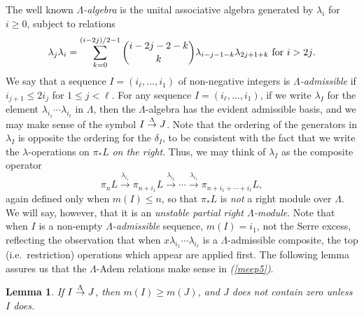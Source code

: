 \documentclass[11pt]{amsart} \renewcommand{\baselinestretch}{1.2}
\theoremstyle{plain}
\newtheorem{lem}[thm]{Lemma}
\numberwithin{equation}{section} %
\theoremstyle{plain}
\newtheorem{lem}[thm]{Lemma}
\numberwithin{equation}{chapter} %
\renewcommand{\to}{\longrightarrow}
\newcommand{\minDimDelta}{m}
\newcommand{\produces}[3]{#3:#1\sim #2}
\renewcommand{\produces}[3]{#1\rightarrow_{#3} #2}%
\renewcommand{\produces}[3]{#1\overset{\smash{#3}}{\rightarrow} #2}%
\begin{document}
\begin{Constructing homotopy operations}
The well known \emph{$\Lambda$-algebra} is the unital associative algebra generated by $\lambda_i$ for $i\geq0$, subject to relations \[\lambda_j\lambda_i=\sum_{k=0}^{(i-2j)/2-1}\binom{i-2j-2-k}{ k}\lambda_{i-j-1-k}\lambda_{2j+1+k}\textup{\ for $i>2j$.}\]
We say that a sequence $I=(i_\ell,\ldots,i_1)$ of non-negative integers is \emph{$\Lambda$-admissible} if $i_{j+1}\leq 2i_j$ for $1\leq j <\ell$. 
For any sequence $I=(i_\ell,\ldots,i_1)$, if we write $\lambda_I$ for the element $\lambda_{i_1}\cdots \lambda_{i_\ell}$ in $\Lambda$, then the $\Lambda$-algebra has the evident admissible basis, and we may make sense of the symbol $\produces{I}{J}{\Lambda}$. Note that the ordering of the generators in $\lambda_I$ is  opposite the ordering for the $\delta_I$, to be consistent with the fact that we write the $\lambda$-operations on $\pi_*L$ \emph{on the right}. Thus, we may think of $\lambda_I$ as the composite operator  
\[\pi_{n}L\overset{\lambda_{i_1}}{\to}\pi_{n+i_1}L\overset{\lambda_{i_2}}{\to}\cdots \overset{\lambda_{i_\ell}}{\to}\pi_{n+i_1+\cdots +i_\ell}L,\]
again defined only when $\minDimDelta(I)\leq n$, so that $\pi_*L$ is \emph{not} a right module over $\Lambda$. We will say, however, that it is an \emph{unstable partial right $\Lambda$-module}.
Note that when $I$ is a non-empty \emph{$\Lambda$-admissible} sequence,
$\minDimDelta(I)=i_1$, not the Serre excess, reflecting the observation that when $x\lambda_{i_1}\cdots \lambda_{i_\ell}$ is a $\Lambda$-admissible composite, the top (i.e.\ restriction) operations which appear are applied first.
The following lemma assures us that the $\Lambda$-Adem relations make sense in \emph{(\ref{meep5})}.
\begin{lem}
\label{lemOnAdemChangeInMLambdaPlain}
If $\produces{I}{J}{\Lambda}$, then $\minDimDelta(I)\geq\minDimDelta(J)$, and $J$ does not contain zero unless $I$ does.

\end{lem}
\end{Constructing homotopy operations}
\end{document}
